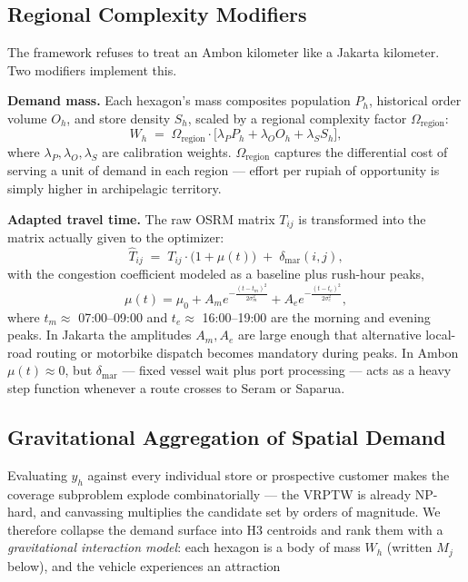 \documentclass[11pt,a4paper,twocolumn]{article}
\begin{document}
\subsection{Regional Complexity Modifiers}
\label{sec:modifiers}

The framework refuses to treat an Ambon kilometer like a Jakarta
kilometer. Two modifiers implement this.

\textbf{Demand mass.} Each hexagon's mass composites population $P_h$,
historical order volume $O_h$, and store density $S_h$, scaled by a
regional complexity factor $\Omega_{\mathrm{region}}$:
\begin{equation}
  \label{eq:mass}
  W_h \;=\; \Omega_{\mathrm{region}} \cdot
    \bigl[ \lambda_P P_h + \lambda_O O_h + \lambda_S S_h \bigr],
\end{equation}
where $\lambda_P, \lambda_O, \lambda_S$ are calibration weights.
$\Omega_{\mathrm{region}}$ captures the differential cost of serving a
unit of demand in each region --- effort per rupiah of opportunity is
simply higher in archipelagic territory.

\textbf{Adapted travel time.} The raw OSRM matrix $T_{ij}$ is transformed
into the matrix actually given to the optimizer:
\begin{equation}
  \label{eq:adapted}
  \widehat{T}_{ij} \;=\; T_{ij} \cdot \bigl(1 + \mu(t)\bigr)
    \;+\; \delta_{\mathrm{mar}}(i,j),
\end{equation}
with the congestion coefficient modeled as a baseline plus rush-hour
peaks,
\begin{equation}
  \label{eq:mu}
  \mu(t) = \mu_0
    + A_m e^{-\frac{(t - t_m)^2}{2\sigma_m^2}}
    + A_e e^{-\frac{(t - t_e)^2}{2\sigma_e^2}},
\end{equation}
where $t_m \approx$ 07:00--09:00 and $t_e \approx$ 16:00--19:00 are the
morning and evening peaks. In Jakarta the amplitudes $A_m, A_e$ are large
enough that alternative local-road routing or motorbike dispatch becomes
mandatory during peaks. In Ambon $\mu(t) \approx 0$, but
$\delta_{\mathrm{mar}}$ --- fixed vessel wait plus port processing ---
acts as a heavy step function whenever a route crosses to Seram or
Saparua.

\subsection{Gravitational Aggregation of Spatial Demand}
\label{sec:gravity}

Evaluating $y_h$ against every individual store or prospective customer
makes the coverage subproblem explode combinatorially --- the VRPTW is
already NP-hard, and canvassing multiplies the candidate set by orders of
magnitude. We therefore collapse the demand surface into H3 centroids and
rank them with a \emph{gravitational interaction model}: each hexagon is a
body of mass $W_h$ (written $M_j$ below), and the vehicle experiences an
attraction
\end{document}
